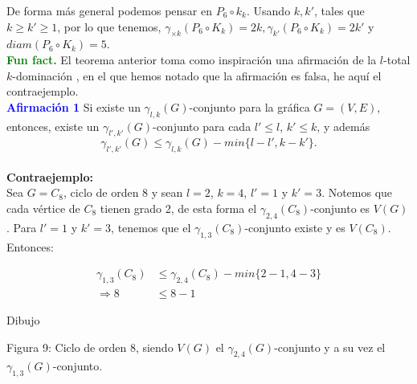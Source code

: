 \documentclass{article}
\begin{document}
De forma más general podemos pensar en $P_6 \circ k_k$. Usando $k, k'$, tales que $k \geq k' \geq 1$, por lo que tenemos, $\gamma_{\times k}(P_{6} \circ K_{k})=2k, \gamma_{k'}(P_{6} \circ K_{k})=2k'$ y $diam(P_{6} \circ K_{k})=5$.\\


\textcolor{Green}{\textbf{Fun fact.}} El teorema anterior toma como inspiración una afirmación de la $l$-total $k$-dominación \cite{favaron2001domination}, en el que hemos notado que la afirmación es falsa, he aquí el contraejemplo.\\

\textcolor{blue}{\textbf{Afirmación 1}} Si existe un $\gamma_{l,k}(G)$-conjunto para la gráfica $G=(V,E)$, entonces, existe un $\gamma_{l',k'}(G)$-conjunto para cada $l' \leq l$, $k' \leq k$, y además 
$$\gamma_{l',k'}(G) \leq \gamma_{l,k}(G) - min\{l-l', k-k'\}.$$\\

\textbf{Contraejemplo:}\\

Sea $G=C_8$, ciclo de orden 8 y sean $l=2$, $k=4$, $l'=1$ y $k'=3$. Notemos que cada vértice de $C_8$ tienen grado 2, de esta forma el  $\gamma_{2,4}(C_8)$-conjunto es $V(G)$. Para $l'=1$ y $k'=3$, tenemos que el $\gamma_{1,3}(C_8)$-conjunto existe y es $V(C_8)$. Entonces:

\begin{align*}
\gamma_{1,3}(C_8) &\le \gamma_{2,4}(C_8) - min\{2-1, 4-3\}\\
\Longrightarrow 8 &\le 8-1
\end{align*}


Dibujo\\



\begin{center}

\vspace{0.5cm}

Figura 9: \small{Ciclo de orden 8, siendo $V(G)$ el $\gamma_{2,4}(G)$-conjunto y a su vez el $\gamma_{1,3}(G)$-conjunto. }


\end{center}
\end{document}
